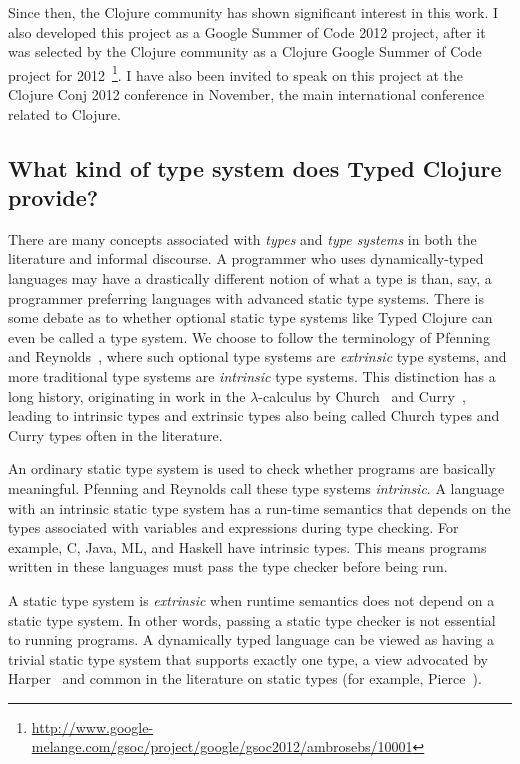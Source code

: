 Since then, the Clojure community has shown significant interest in this work.
I also developed this project as a Google Summer of Code 2012 project,
after it was selected by the Clojure community as a Clojure Google Summer of Code
project for 2012~\footnote{\url{http://www.google-melange.com/gsoc/project/google/gsoc2012/ambrosebs/10001}}.
I have also been invited to speak on this project at the Clojure Conj
2012 conference in November, the main international conference related to Clojure.

\subsection{What kind of type system does Typed Clojure provide?}


There are many concepts associated with \emph{types} and \emph{type systems} in both the
literature and informal discourse.
A programmer who uses dynamically-typed languages may have a drastically different notion
of what a type is than, say, a programmer preferring languages with advanced static type systems.
There is some debate as to whether optional static type systems like Typed Clojure
can even be called a type system. We choose to
follow the terminology of Pfenning~\cite{Pfe08} and Reynolds~\cite{Rey02},
where such optional type systems are \emph{extrinsic} type systems, and more
traditional type systems are \emph{intrinsic} type systems.
This distinction has a long history, originating in work in the $\lambda$-calculus 
by Church~\cite{Chu40} and Curry~\cite{Cur34},
leading to intrinsic types and extrinsic types also being called Church types and
Curry types often in the literature.

An ordinary static type system is used to check whether programs are basically
meaningful. Pfenning and Reynolds call these type systems \emph{intrinsic}. A language with an intrinsic
static type system has a run-time semantics that depends on the types associated
with variables and expressions during type checking.
For example, C, Java, ML, and Haskell have intrinsic types.
This means programs written in these languages must pass the type checker before being run.

A static type system is \emph{extrinsic} when runtime semantics
does not depend on a static type system. In other words, passing a static type checker
is not essential to running programs. A dynamically typed language can be viewed
as having a trivial static type system that supports exactly one type,
a view advocated by Harper~\cite{Har12}
and common in the literature on static types (for example, Pierce~\cite{Pie02}).

